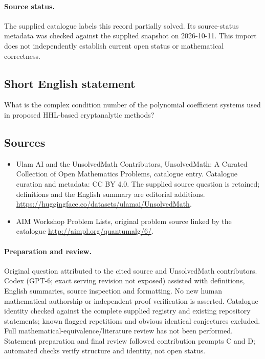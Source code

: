 \documentclass[11pt]{article}
\begin{document}
\paragraph{Source status.}
The supplied catalogue labels this record partially solved. Its source-status metadata was checked against the supplied snapshot on 2026-10-11. This import does not independently establish current open status or mathematical correctness.
\subsection{Short English statement}
What is the complex condition number of the polynomial coefficient systems used in proposed HHL-based cryptanalytic methods?
\subsection{Sources}
\begin{itemize}
\item[S1] Ulam AI and the UnsolvedMath Contributors, UnsolvedMath: A Curated Collection of Open Mathematics Problems, catalogue entry. Catalogue curation and metadata: CC BY 4.0. The supplied source question is retained; definitions and the English summary are editorial additions.
\url{https://huggingface.co/datasets/ulamai/UnsolvedMath}.
\item[S2] AIM Workshop Problem Lists, original problem source linked by the catalogue
\url{http://aimpl.org/quantumalg/6/}.
\end{itemize}
\paragraph{Preparation and review.}
Original question attributed to the cited source and UnsolvedMath contributors. Codex (GPT-6; exact serving revision not exposed) assisted with definitions, English summaries, source inspection and formatting. No new human mathematical authorship or independent proof verification is asserted. Catalogue identity checked against the complete supplied registry and existing repository statements; known flagged repetitions and obvious identical conjectures excluded. Full mathematical-equivalence/literature review has not been performed. Statement preparation and final review followed contribution prompts C and D; automated checks verify structure and identity, not open status.
\label{end:statement}
\end{document}
